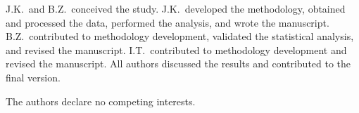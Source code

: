 \documentclass[sn-nature]{sn-jnl}%
\begin{document}

J.K.\ and B.Z.\ conceived the study. J.K.\ developed the methodology, obtained and processed the data, performed the analysis, and wrote the manuscript. B.Z.\ contributed to methodology development, validated the statistical analysis, and revised the manuscript. I.T.\ contributed to methodology development and revised the manuscript. All authors discussed the results and contributed to the final version.


The authors declare no competing interests.




\end{document}
